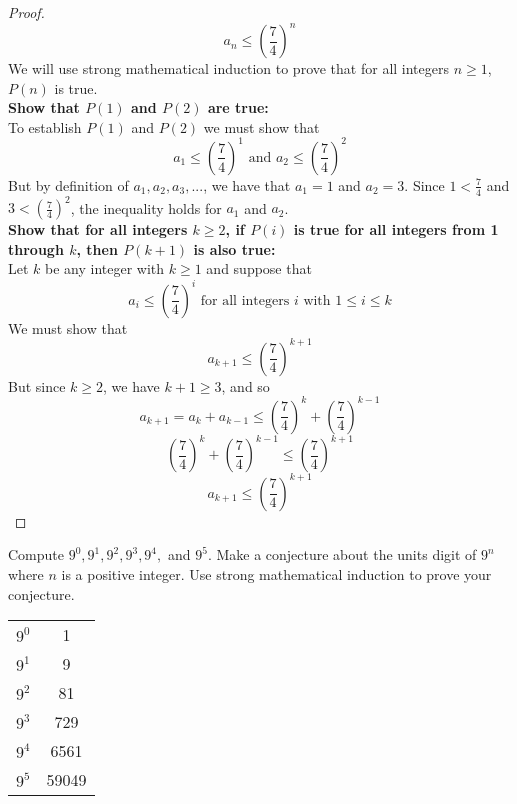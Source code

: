 \documentclass[12pt,letterpaper, onecolumn]{exam}
\begin{document}
\begin{questions}
\begin{solution}
\begin{proof}
			$$a_n\leq \left(\frac{7}{4}\right)^n$$
			We will use strong mathematical induction to prove that for all integers $n\geq1$, $P(n)$ is true.\\
			\textbf{Show that $P(1)$ and $P(2)$ are true:}\\
			To establish $P(1)$ and $P(2)$ we must show that\\
			$$a_1\leq \left(\frac{7}{4}\right)^1 \textrm{ and }a_2\leq \left(\frac{7}{4}\right)^2$$
		But by definition of $a_1,a_2,a_3,...$, we have that $a_1=1$ and $a_2=3$. Since $1<\frac{7}{4}$ and $3<(\frac{7}{4})^2$, the inequality holds for $a_1$ and $a_2$.\\
		\textbf{Show that for all integers $k\geq2$, if $P(i)$ is true for all integers from 1 through $k$, then $P(k+1)$ is also true:}\\
		Let $k$ be any integer with $k\geq1$ and suppose that 
		$$a_i \leq \left(\frac{7}{4}\right)^i \textrm{ for all integers } i \textrm{ with } 1\leq i \leq k$$
		We must show that
		$$a_{k+1}\leq \left(\frac{7}{4}\right)^{k+1}$$
		But since $k\geq2$, we have $k+1 \geq 3$, and so
		$$a_{k+1}=a_k+a_{k-1}\leq \left(\frac{7}{4}\right)^k + \left(\frac{7}{4}\right)^{k-1} $$
		$$\left(\frac{7}{4}\right)^k + \left(\frac{7}{4}\right)^{k-1} \leq \left(\frac{7}{4}\right)^{k+1}$$
		$$a_{k+1}\leq \left(\frac{7}{4}\right)^{k+1}$$
			\end{proof}
		\end{solution}
		\pagebreak
		\setcounter{question}{17} \question Compute $9^0,9^1,9^2,9^3,9^4,$ and $9^5$. Make a conjecture about the units digit of $9^n$ where $n$ is a positive integer. Use strong mathematical induction to prove your conjecture.
		\begin{solution}
		\begin{center}
	\begin{tabular}{c | c}
	$9^0$&1\\
	$9^1$&9\\
	$9^2$&81\\
	$9^3$&729\\
	$9^4$&6561\\
	$9^5$&59049\\
\end{tabular}\\
		\end{center}
	

\end{solution}
\end{questions}
\end{document}
